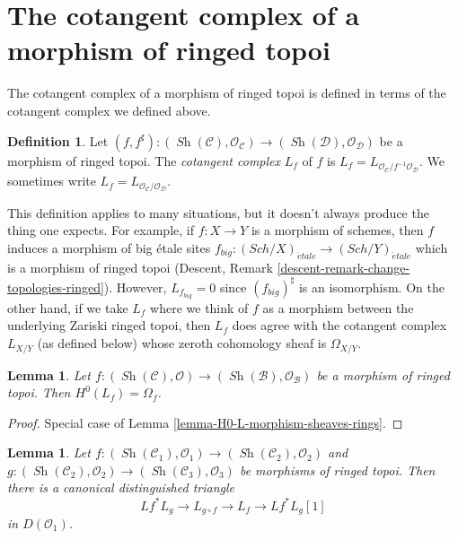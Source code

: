 \documentclass{stacks-project}
\theoremstyle{plain}
\newtheorem{lemma}[subsection]{Lemma}
\theoremstyle{definition}
\newtheorem{definition}[subsection]{Definition}
\theoremstyle{remark}
\numberwithin{equation}{subsection}
\def\Sch{\mathit{Sch}}
\def\Sh{\mathop{\mathit{Sh}}\nolimits}
\def\etale{{\acute{e}tale}}
\begin{document}
\section{The cotangent complex of a morphism of ringed topoi}
\label{section-cotangent-morphism-ringed-topoi}

\noindent
The cotangent complex of a morphism of ringed topoi is defined
in terms of the cotangent complex we defined above.

\begin{definition}
\label{definition-cotangent-complex-morphism-ringed-topoi}
Let $(f, f^\sharp) : (\Sh(\mathcal{C}), \mathcal{O}_\mathcal{C}) \to
(\Sh(\mathcal{D}), \mathcal{O}_\mathcal{D})$ be a morphism of ringed topoi.
The {\it cotangent complex} $L_f$ of $f$ is
$L_f = L_{\mathcal{O}_\mathcal{C}/f^{-1}\mathcal{O}_\mathcal{D}}$.
We sometimes write $L_f = L_{\mathcal{O}_\mathcal{C}/\mathcal{O}_\mathcal{D}}$.
\end{definition}

\noindent
This definition applies to many situations, but it doesn't always produce
the thing one expects. For example, if $f : X \to Y$ is a morphism of
schemes, then $f$ induces a morphism of big \'etale sites
$f_{big} : (\Sch/X)_\etale \to (\Sch/Y)_\etale$
which is a morphism of ringed topoi (Descent, Remark
\ref{descent-remark-change-topologies-ringed}).
However, $L_{f_{big}} = 0$ since $(f_{big})^\sharp$ is an isomorphism.
On the other hand, if we take $L_f$ where we think of $f$ as a morphism
between the underlying Zariski ringed topoi, then $L_f$ does agree with
the cotangent complex $L_{X/Y}$ (as defined below)
whose zeroth cohomology sheaf is $\Omega_{X/Y}$.

\begin{lemma}
\label{lemma-H0-L-morphism-ringed-topoi}
Let $f : (\Sh(\mathcal{C}), \mathcal{O}) \to
(\Sh(\mathcal{B}), \mathcal{O}_\mathcal{B})$ be a morphism of
ringed topoi. Then $H^0(L_f) = \Omega_f$.
\end{lemma}

\begin{proof}
Special case of Lemma \ref{lemma-H0-L-morphism-sheaves-rings}.
\end{proof}

\begin{lemma}
\label{lemma-triangle-ringed-topoi}
Let $f : (\Sh(\mathcal{C}_1), \mathcal{O}_1) \to
(\Sh(\mathcal{C}_2), \mathcal{O}_2)$ and
$g : (\Sh(\mathcal{C}_2), \mathcal{O}_2) \to
(\Sh(\mathcal{C}_3), \mathcal{O}_3)$ be morphisms of ringed topoi.
Then there is a canonical distinguished triangle
$$
Lf^* L_g \to L_{g \circ f} \to L_f \to Lf^*L_g[1]
$$
in $D(\mathcal{O}_1)$.
\end{lemma}
\end{document}
